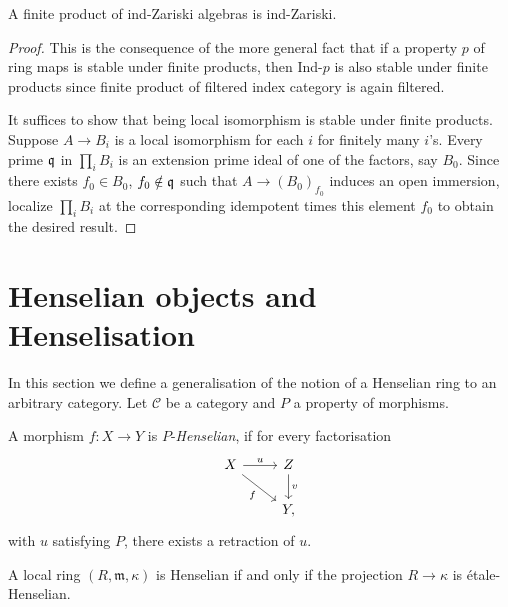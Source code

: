 \begin{lemma}
  A finite product of ind-Zariski algebras is ind-Zariski.
  \label{lemma:ind-Zariski-products}
\end{lemma}

\begin{proof}
  This is the consequence of the more general fact that if a property $p$ of ring maps is stable under finite products, then Ind-$p$ is also stable under finite products since finite product of filtered index category is again filtered. 
  
  It suffices to show that being local isomorphism is stable under finite products. Suppose $A \to B_i$ is a local isomorphism for each $i$ for finitely many $i$'s. Every prime ${\mathfrak{q}}$ in $\prod_i B_i$ is an extension prime ideal of one of the factors, say $B_0$. Since there exists $f_0 \in B_0$, $f_0 \notin {\mathfrak{q}}$ such that $A \to (B_0)_{f_0}$ induces an open immersion, localize $\prod_i B_i$ at the corresponding idempotent times this element \(f_0\) to obtain the desired result.
\end{proof}

\section{Henselian objects and Henselisation}

In this section we define a generalisation of the notion of a Henselian ring to an arbitrary category. Let $\mathcal{C}$ be a category
and $P$ a property of morphisms.

\begin{definition}[Henselian]
    A morphism $f\colon X \to Y$ is $P$-\emph{Henselian}, if for every factorisation
    \[
    \begin{tikzcd}
        X \arrow{r}{u} \arrow[swap]{dr}{f} & Z \arrow{d}{v} \\
                    & Y,
    \end{tikzcd}
    \] with $u$ satisfying $P$, there exists a retraction of $u$.
    \label{def:p-henselian}
\end{definition}

\begin{example}
    A local ring $(R, \mathfrak{m}, \kappa)$ is Henselian if and only if the projection $R \to \kappa$ is étale-Henselian.
\end{example}

